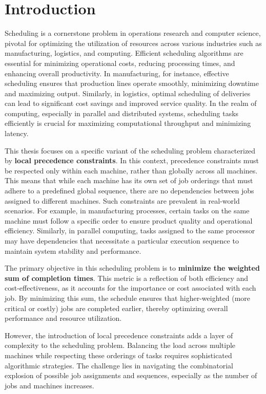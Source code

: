 \chapter{Introduction}

Scheduling is a cornerstone problem in operations research and computer science, pivotal for optimizing the utilization of resources across various industries such as manufacturing, logistics, and computing. Efficient scheduling algorithms are essential for minimizing operational costs, reducing processing times, and enhancing overall productivity. In manufacturing, for instance, effective scheduling ensures that production lines operate smoothly, minimizing downtime and maximizing output. Similarly, in logistics, optimal scheduling of deliveries can lead to significant cost savings and improved service quality. In the realm of computing, especially in parallel and distributed systems, scheduling tasks efficiently is crucial for maximizing computational throughput and minimizing latency.

This thesis focuses on a specific variant of the scheduling problem characterized by \textbf{local precedence constraints}. In this context, precedence constraints must be respected only within each machine, rather than globally across all machines. This means that while each machine has its own set of job orderings that must adhere to a predefined global sequence, there are no dependencies between jobs assigned to different machines. Such constraints are prevalent in real-world scenarios. For example, in manufacturing processes, certain tasks on the same machine must follow a specific order to ensure product quality and operational efficiency. Similarly, in parallel computing, tasks assigned to the same processor may have dependencies that necessitate a particular execution sequence to maintain system stability and performance.

The primary objective in this scheduling problem is to \textbf{minimize the weighted sum of completion times}. This metric is a reflection of both efficiency and cost-effectiveness, as it accounts for the importance or cost associated with each job. By minimizing this sum, the schedule ensures that higher-weighted (more critical or costly) jobs are completed earlier, thereby optimizing overall performance and resource utilization. \medbreak

However, the introduction of local precedence constraints adds a layer of complexity to the scheduling problem. Balancing the load across multiple machines while respecting these orderings of tasks requires sophisticated algorithmic strategies. The challenge lies in navigating the combinatorial explosion of possible job assignments and sequences, especially as the number of jobs and machines increases.


